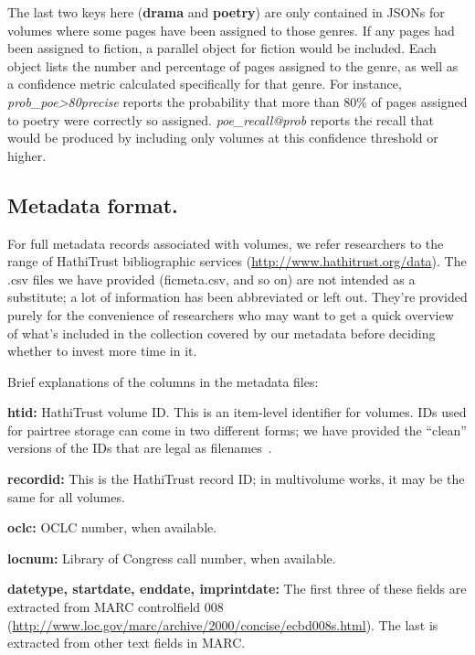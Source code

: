 \documentclass[paper=a4, fontsize=12pt]{scrartcl}
\numberwithin{equation}{section}		%
\numberwithin{figure}{section}			%
\numberwithin{table}{section}				%
\begin{document}
\vspace{2mm}
\noindent The last two keys here (\textbf{drama} and \textbf{poetry}) are only contained in JSONs for volumes where some pages have been assigned to those genres. If any pages had been assigned to fiction, a parallel object for fiction would be included. Each object lists the number and percentage of pages assigned to the genre, as well as a confidence metric calculated specifically for that genre. For instance, \textit{prob\_poe>80precise} reports the probability that more than 80\% of pages assigned to poetry were correctly so assigned. \textit{poe\_recall@prob} reports the recall that would be produced by including only volumes at this confidence threshold or higher.

\FloatBarrier

\subsection{Metadata format.}
For full metadata records associated with volumes, we refer researchers to the range of HathiTrust bibliographic services (\url{http://www.hathitrust.org/data}). The .csv files we have provided (ficmeta.csv, and so on) are not intended as a substitute; a lot of information has been abbreviated or left out. They're provided purely for the convenience of researchers who may want to get a quick overview of what's included in the collection covered by our metadata before deciding whether to invest more time in it.

Brief explanations of the columns in the metadata files:

\noindent \textbf{htid:} HathiTrust volume ID. This is an item-level identifier for volumes. IDs used for pairtree storage can come in two different forms; we have provided the ``clean'' versions of the IDs that are legal as filenames~\cite{pairtree}.

\noindent \textbf{recordid:} This is the HathiTrust record ID; in multivolume works, it may be the same for all volumes.

\noindent \textbf{oclc:} OCLC number, when available.

\noindent \textbf{locnum:} Library of Congress call number, when available.

\noindent \textbf{datetype, startdate, enddate, imprintdate:} The first three of these fields are extracted from MARC controlfield 008 (\url{http://www.loc.gov/marc/archive/2000/concise/ecbd008s.html}). The last is extracted from other text fields in MARC.
\end{document}
